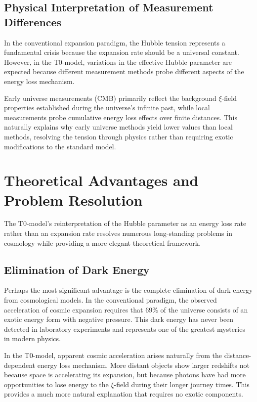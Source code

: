 \documentclass[12pt,a4paper]{article}
\begin{document}
	\subsection{Physical Interpretation of Measurement Differences}
	
	In the conventional expansion paradigm, the Hubble tension represents a fundamental crisis because the expansion rate should be a universal constant. However, in the T0-model, variations in the effective Hubble parameter are expected because different measurement methods probe different aspects of the energy loss mechanism.
	
	Early universe measurements (CMB) primarily reflect the background $\xi$-field properties established during the universe's infinite past, while local measurements probe cumulative energy loss effects over finite distances. This naturally explains why early universe methods yield lower values than local methods, resolving the tension through physics rather than requiring exotic modifications to the standard model.
	
	\section{Theoretical Advantages and Problem Resolution}
	
	The T0-model's reinterpretation of the Hubble parameter as an energy loss rate rather than an expansion rate resolves numerous long-standing problems in cosmology while providing a more elegant theoretical framework.
	
	\subsection{Elimination of Dark Energy}
	
	Perhaps the most significant advantage is the complete elimination of dark energy from cosmological models. In the conventional paradigm, the observed acceleration of cosmic expansion requires that 69\% of the universe consists of an exotic energy form with negative pressure. This dark energy has never been detected in laboratory experiments and represents one of the greatest mysteries in modern physics.
	
	In the T0-model, apparent cosmic acceleration arises naturally from the distance-dependent energy loss mechanism. More distant objects show larger redshifts not because space is accelerating its expansion, but because photons have had more opportunities to lose energy to the $\xi$-field during their longer journey times. This provides a much more natural explanation that requires no exotic components.
	
\end{document}
